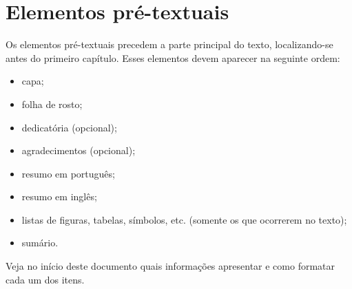 \documentclass{ifsultcc}
\begin{document}
\section{Elementos pré-textuais}
Os elementos pré-textuais precedem a parte principal do texto, localizando-se antes do primeiro capítulo.  Esses elementos devem aparecer na seguinte ordem:
\begin{itemize}
	\item capa;
	\item folha de rosto;
	\item dedicatória (opcional);
	\item agradecimentos (opcional);
	\item resumo em português;
	\item resumo em inglês;
	\item listas de figuras, tabelas, símbolos, etc. (somente os que ocorrerem  no texto);
	\item sumário.
\end{itemize}

Veja no início deste documento quais informações apresentar e como formatar cada um dos itens. 



%
%

\end{document}
